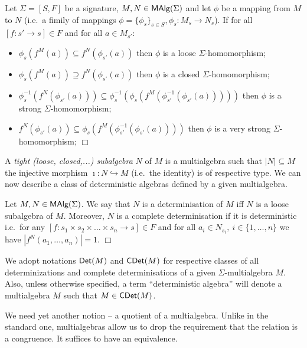 \begin{Definition}
Let $\Sigma = [S,F]$ be a signature, $M,N \in \mbox{\rm\sf MAlg}(\Sigma)$ and let
$\phi$ be a mapping from $M$ to $N$ (i.e.\ a fimily of mappings 
$\phi = \{\phi_s\}_{s \in S}, \phi_s: M_s \rightarrow N_s$).
If for all $[f : s' \rightarrow s] \in F$ and for all $a \in M_{s'}$: 
\begin{itemize}
\item{ $\phi_s(f^M(a)) \subseteq f^N(\phi_{s'}(a))$ 
       then $\phi$ is a loose $\Sigma$-homomorphism; }
\item{ $\phi_s(f^M(a)) \supseteq f^N(\phi_{s'}(a))$ 
       then $\phi$ is a closed $\Sigma$-homomorphism; }
\item{ $\phi_s^{-1}(f^N(\phi_{s'}(a))) \subseteq
       \phi^{-1}_s(\phi_s(f^M(\phi^{-1}_{s'}(\phi_{s'}(a)))))$
      then $\phi$ is a strong $\Sigma$-homomorphism; }
\item{ $f^N(\phi_{s'}(a)) \subseteq
       \phi_s(f^M(\phi^{-1}_{s'}(\phi_{s'}(a))))$
       then $\phi$ is a very strong $\Sigma$-homomorphism; \hfill$\Box$}
\end{itemize}
\end{Definition}
%
A {\em tight (loose, closed,...) subalgebra} $N$ of $M$ is a
multialgebra such that $|N| \subseteq M$ the injective morphism
$\imath : N \hookrightarrow M$ (i.e.\ the identity) is of respective
type. We can now describe a class of deterministic algebras defined by
a given multialgebra.

\begin{Definition}
Let $M,N \in \mbox{\rm\sf MAlg}(\Sigma)$. We say that $N$ is a determinisation of
$M$ iff $N$ is a loose subalgebra of $M$. Moreover, $N$ is a complete
determinisation if it is deterministic i.e.\ for any $[f : s_1 \times
s_2 \times \ldots \times s_n \rightarrow s] \in F$ and for all $a_i
\in N_{s_i},\ i \in \{1,\ldots,n\}$ we have $|f^N(a_1,\ldots,a_n)| =
1.$ 
\hfill$\Box$
\end{Definition}
%
We adopt notations $\mbox{\sf Det}(M)$ and $\mbox{\sf CDet}(M)$ for respective classes of
all determinizations and complete determinisations of a given
$\Sigma$-multialgebra $M$. Also, unless otherwise specified, a term
``deterministic algebra'' will denote a multialgebra $M$ such that $M
\in \mbox{\sf CDet}(M)$.

We need yet another notion -- a quotient of a multialgebra. Unlike in
the standard one, multialgebras allow us to drop the requirement that
the relation is a congruence. It suffices to have an equivalence.

